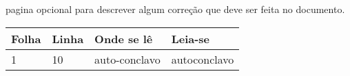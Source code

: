 \documentclass[
12pt,				%
openany,			%
oneside,			%
a4paper,			%
english,			%
french,				%
spanish,			%
brazil				%
]{abntex2}
\begin{document}
	\begin{errata}
		pagina opcional para descrever algum correção que deve ser feita no documento.
		
		\begin{table}[htb]
			\center
			\footnotesize
			\begin{tabular}{|p{1.4cm}|p{1cm}|p{3cm}|p{3cm}|}
				\hline
				\textbf{Folha} & \textbf{Linha}  & \textbf{Onde se lê}  & \textbf{Leia-se}  \\
				\hline
				1 & 10 & auto-conclavo & autoconclavo\\
				\hline
			\end{tabular}
		\end{table}
		
	\end{errata}
	
	
\end{document}
